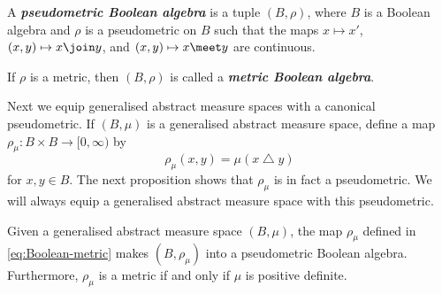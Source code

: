 \documentclass[article, a4paper, 11pt, oneside]{memoir}
\numberwithin{equation}{chapter}
\renewcommand{\symdiff}{\mathbin{\triangle}}
\newcommand{\keyword}[1]{{\itshape\bfseries #1}}
\begin{document}
\begin{definition}
    A \keyword{pseudometric Boolean algebra} is a tuple $(B,\rho)$, where $B$ is a Boolean algebra and $\rho$ is a pseudometric on $B$ such that the maps $x \mapsto x'$, $(x,y) \mapsto x \join y$, and $(x,y) \mapsto x \meet y$ are continuous.

    If $\rho$ is a metric, then $(B,\rho)$ is called a \keyword{metric Boolean algebra}.
\end{definition}

Next we equip generalised abstract measure spaces with a canonical pseudometric. If $(B,\mu)$ is a generalised abstract measure space, define a map $\rho_\mu \colon B \times B \to [0,\infty)$ by
%
\begin{equation}
    \label{eq:Boolean-metric}
    \rho_\mu(x,y)
        = \mu(x \symdiff y)
\end{equation}
%
for $x,y \in B$. The next proposition shows that $\rho_\mu$ is in fact a pseudometric. We will always equip a generalised abstract measure space with this pseudometric.

\begin{proposition}
    Given a generalised abstract measure space $(B,\mu)$, the map $\rho_\mu$ defined in \cref{eq:Boolean-metric} makes $(B,\rho_\mu)$ into a pseudometric Boolean algebra. Furthermore, $\rho_\mu$ is a metric if and only if $\mu$ is positive definite.
\end{proposition}
\end{document}
